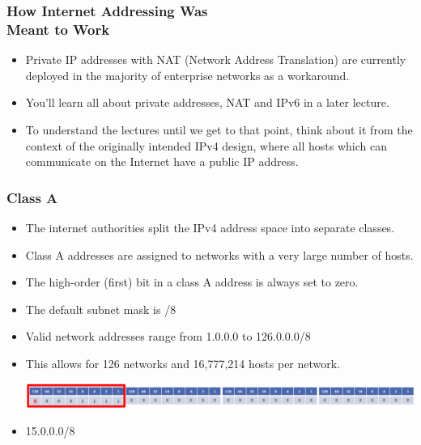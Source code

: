 \documentclass[pdflatex,compress]{beamer}
\begin{document}
\begin{frame}
	\frametitle{How Internet Addressing Was\\Meant to Work}
	\begin{itemize}
		\item Private IP addresses with NAT (Network Address Translation) are currently deployed in the majority of enterprise networks as a workaround.
		\item You’ll learn all about private addresses, NAT and IPv6 in a later lecture.
		\item To understand the lectures until we get to that point, think about it from the context of the originally intended IPv4 design, where all hosts which can communicate on the Internet have a public IP address.
	\end{itemize}
\end{frame}

\begin{frame}
	\frametitle{Class A}
	\begin{itemize}
		\item The internet authorities split the IPv4 address space into separate classes.
		\item Class A addresses are assigned to networks with a very large number of hosts.
		\item The high-order (first) bit in a class A address is always set to zero.
		\item The default subnet mask is /8
		\item Valid network addresses range from 1.0.0.0 to 126.0.0.0/8
		\item This allows for 126 networks and 16,777,214 hosts per network.
		\begin{center}
			\includegraphics[width=1\linewidth]{img/img02}
		\end{center}
		\item 15.0.0.0/8
	\end{itemize}
\end{frame}
\end{document}
